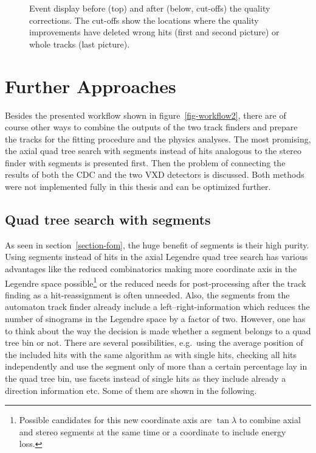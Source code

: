 \begin{figure}
\begin{tikzpicture}[>=latex']
    
  \end{tikzpicture}
  \caption{Event display before (top) and after (below, cut-offs) the quality corrections. The cut-offs show the locations where the quality improvements have deleted wrong hits (first and second picture) or whole tracks (last picture).}
  \label{fig-quality}
\end{figure}



\section{Further Approaches} \label{section-outlook}

Besides the presented workflow shown in figure~\ref{fig-workflow2}, there are of course other ways to combine the outputs of the two track finders and prepare the tracks for the fitting procedure and the physics analyses. The most promising, the axial quad tree search with segments instead of hits analogous to the stereo finder with segments is presented first. Then the problem of connecting the results of both the CDC and the two VXD detectors is discussed. Both methods were not implemented fully in this thesis and can be optimized further.


\subsection{Quad tree search with segments}

As seen in section~\ref{section-fom}, the huge benefit of segments is their high purity. Using segments instead of hits in the axial Legendre quad tree search has various advantages like the reduced combinatorics making more coordinate axis in the Legendre space possible\footnote{Possible candidates for this new coordinate axis are $\tan \lambda$ to combine axial and stereo segments at the same time or a coordinate to include energy loss.} or the reduced needs for post-processing after the track finding as a hit-reassignment is often unneeded. Also, the segments from the automaton track finder already include a left--right-information which reduces the number of sinograms in the Legendre space by a factor of two. However, one has to think about the way the decision is made whether a segment belongs to a quad tree bin or not. There are several possibilities, e.g.\ using the average position of the included hits with the same algorithm as with single hits, checking all hits independently and use the segment only of more than a certain percentage lay in the quad tree bin, use facets instead of single hits as they include already a direction information etc. Some of them are shown in the following.

